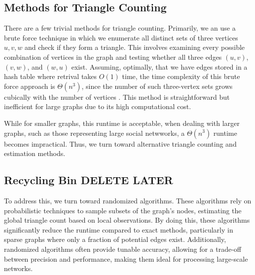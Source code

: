 \documentclass[12pt]{article}
\begin{document}
\subsection{Methods for Triangle Counting}

There are a few trivial methods for triangle counting.
Primarily, we an use a brute force technique in which we enumerate all distinct sets of three vertices ${u, v, w}$ and check if they form a triangle.
This involves examining every possible combination of vertices in the graph and testing whether all three edges $(u, v)$, $(v, w)$, and $(w, u)$ exist.
Assuming, optimally, that we have edges stored in a hash table where retrival takes $O(1)$ time, the time complexity of this brute force approach is $\Theta(n^3)$, since the number of such three-vertex sets grows cubically with the number of vertices \cite{al_hasan_triangle_2018}.
This method is straightforward but inefficient for large graphs due to its high computational cost.

While for smaller graphs, this runtime is acceptable, when dealing with larger graphs, such as those representing large social netwworks, a $\Theta(n^3)$ runtime becomes impractical.
Thus, we turn toward alternative triangle counting and estimation methods.


\subsection{Recycling Bin DELETE LATER}

To address this, we turn toward randomized algorithms. These algorithms rely on probabilistic techniques to sample subsets of the graph's nodes, estimating the global triangle count based on local observations.
By doing this, these algorithms significantly reduce the runtime compared to exact methods, particularly in sparse graphs where only a fraction of potential edges exist.
Additionally, randomized algorithms often provide tunable accuracy, allowing for a trade-off between precision and performance, making them ideal for processing large-scale networks.

\newpage


\end{document}
